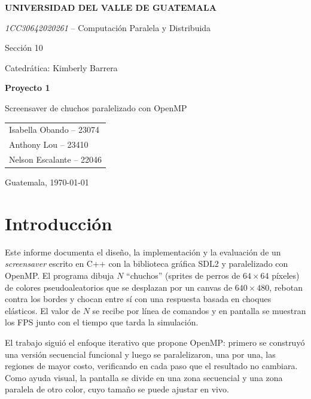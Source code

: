 \documentclass[11pt,letterpaper]{article}
\begin{document}
\begin{titlepage}
  \centering
  {\large\bfseries UNIVERSIDAD DEL VALLE DE GUATEMALA\par}
  \vspace{0.2cm}
  {\itshape 1CC30642020261} -- Computación Paralela y Distribuida\par
  Sección 10\par
  Catedrática: Kimberly Barrera\par
  \vspace{4cm}
  {\Huge\bfseries Proyecto 1\par}
  \vspace{0.4cm}
  {\LARGE Screensaver de chuchos paralelizado con OpenMP\par}
  \vspace{4cm}
  \begin{tabular}{l}
    Isabella Obando -- 23074 \\
    Anthony Lou -- 23410 \\
    Nelson Escalante -- 22046 \\
  \end{tabular}
  \vfill
  {\large Guatemala, \today\par}
\end{titlepage}

\tableofcontents
\newpage

\section{Introducción}

Este informe documenta el diseño, la implementación y la evaluación de un
\emph{screensaver} escrito en C++ con la biblioteca gráfica SDL2 y paralelizado
con OpenMP. El programa dibuja $N$ ``chuchos'' (sprites de perros de
$64\times64$ píxeles) de colores pseudoaleatorios que se desplazan por un canvas
de $640\times480$, rebotan contra los bordes y chocan entre sí con una respuesta
basada en choques elásticos. El valor de $N$ se recibe por línea de comandos y
en pantalla se muestran los FPS junto con el tiempo que tarda la simulación.

El trabajo siguió el enfoque iterativo que propone OpenMP: primero se construyó
una versión secuencial funcional y luego se paralelizaron, una por una, las
regiones de mayor costo, verificando en cada paso que el resultado no cambiara.
Como ayuda visual, la pantalla se divide en una zona secuencial y una zona
paralela de otro color, cuyo tamaño se puede ajustar en vivo.
\end{document}
